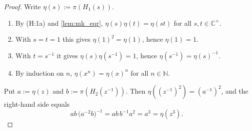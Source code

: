 \documentclass[11pt]{article}
\theoremstyle{definition}
\theoremstyle{remark}
\newcommand{\Cx}{\mathbb{C}^\times}
\begin{document}
\begin{proof}
Write $\eta(s):=\pi(H_1(s))$.
\begin{enumerate}
\item By (H:1a) and \cref{lem:mk_eqr}, $\eta(s)\eta(t)=\eta(st)$ for all $s,t\in\Cx$.
\item With $s=t=1$ this gives $\eta(1)^2=\eta(1)$, hence $\eta(1)=1$.
\item With $t=s^{-1}$ it gives $\eta(s)\eta(s^{-1})=1$, hence $\eta(s^{-1})=\eta(s)^{-1}$.
\item By induction on $n$, $\eta(x^n)=\eta(x)^n$ for all $n\in\mathbb N$.
\end{enumerate}
Put $a:=\eta(z)$ and $b:=\pi(H_2(z^{-1}))$. Then $\eta((z^{-1})^2)=(a^{-1})^2$, and the right-hand side equals
\[
ab\,\bigl(a^{-2}b\bigr)^{-1}=ab\,b^{-1}a^{2}=a^3=\eta(z^3).
\]
\end{proof}
\end{document}
